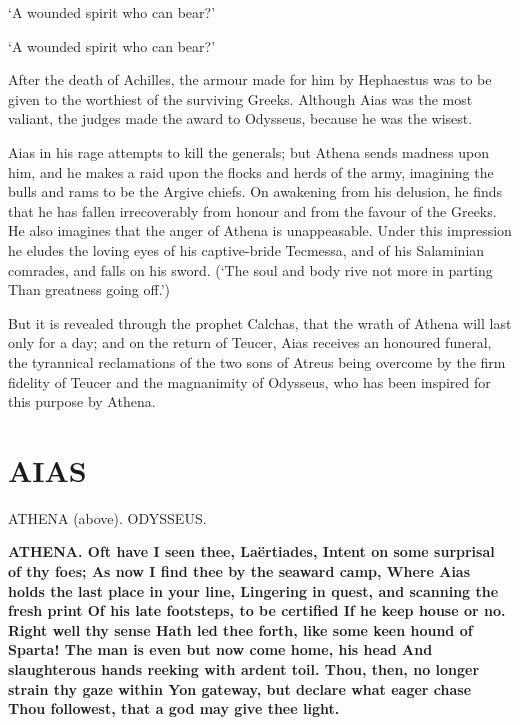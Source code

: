 \documentclass[11pt,letter]{book}
\begin{document}
\par  [page 42] ‘A wounded spirit who can bear?’

\par  [page 42] ‘A wounded spirit who can bear?’

\par  After the death of Achilles, the armour made for him by Hephaestus was to be given to the worthiest of the surviving Greeks. Although Aias was the most valiant, the judges made the award to Odysseus, because he was the wisest.

\par  Aias in his rage attempts to kill the generals; but Athena sends madness upon him, and he makes a raid upon the flocks and herds of the army, imagining the bulls and rams to be the Argive chiefs. On awakening from his delusion, he finds that he has fallen irrecoverably from honour and from the favour of the Greeks. He also imagines that the anger of Athena is unappeasable. Under this impression he eludes the loving eyes of his captive-bride Tecmessa, and of his Salaminian comrades, and falls on his sword. (‘The soul and body rive not more in parting Than greatness going off.’)

\par  But it is revealed through the prophet Calchas, that the wrath of Athena will last only for a day; and on the return of Teucer, Aias receives an honoured funeral, the tyrannical reclamations of the two sons of Atreus being overcome by the firm fidelity of Teucer and the magnanimity of Odysseus, who has been inspired for this purpose by Athena.

\par  [page 43]
\section{AIAS}
\par  ATHENA (above). ODYSSEUS.

\par \textbf{ATHENA. Oft have I seen thee, Laërtiades, Intent on some surprisal of thy foes; As now I find thee by the seaward camp, Where Aias holds the last place in your line, Lingering in quest, and scanning the fresh print Of his late footsteps, to be certified If he keep house or no. Right well thy sense Hath led thee forth, like some keen hound of Sparta! The man is even but now come home, his head And slaughterous hands reeking with ardent toil. Thou, then, no longer strain thy gaze within Yon gateway, but declare what eager chase Thou followest, that a god may give thee light.}
\par 
\end{document}
